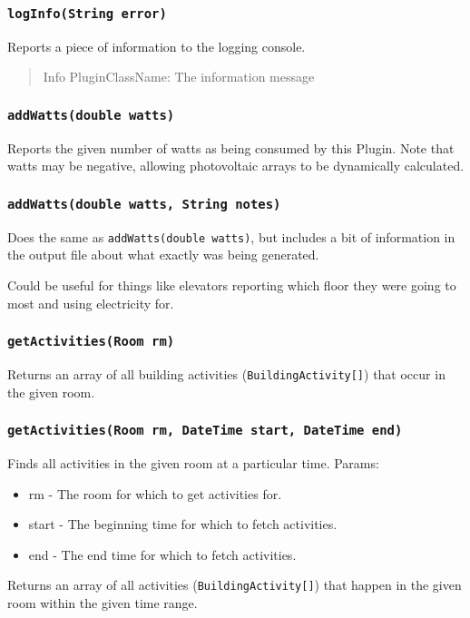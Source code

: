 \documentclass[12pt,a4paper]{article}
\begin{document}
\subsubsection{\texttt{logInfo(String error)}}
Reports a piece of information to the logging console.
\begin{quote}
Info PluginClassName: The information message
\end{quote}



\subsubsection{\texttt{addWatts(double watts)}}
Reports the given number of watts as being consumed by this Plugin. Note that watts may be negative, allowing photovoltaic arrays to be dynamically calculated.


\subsubsection{\texttt{addWatts(double watts, String notes)}}
Does the same as \texttt{addWatts(double watts)}, but includes a bit of information in the output file about what exactly was being generated.

Could be useful for things like elevators reporting which floor they were going to most and using electricity for.


\subsubsection{\texttt{getActivities(Room rm)}}
Returns an array of all building activities (\texttt{BuildingActivity[]}) that occur in 
the given room.


\subsubsection{\texttt{getActivities(Room rm, DateTime start, DateTime end)}}
Finds all activities in the given room at a particular time. Params:
\begin{itemize}
  \item rm - The room for which to get activities for.
  \item start - The beginning time for which to fetch activities.
  \item end - The end time for which to fetch activities.
\end{itemize}

Returns an array of all activities (\texttt{BuildingActivity[]}) that happen in the given room within the given time range.
\end{document}
